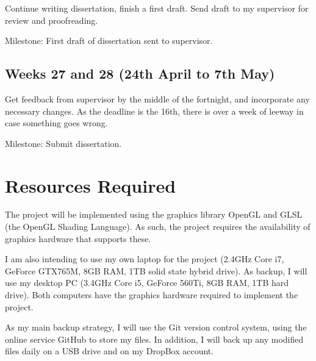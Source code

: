 \documentclass[12pt,twoside,notitlepage]{report}
\begin{document}
Continue writing dissertation, finish a first draft. Send draft to my supervisor for review and proofreading.

Milestone: First draft of dissertation sent to supervisor.

\subsection*{Weeks 27 and 28 (24th April to 7th May)}

Get feedback from supervisor by the middle of the fortnight, and incorporate any necessary changes. As the deadline is the 16th, there is over a week of leeway in case something goes wrong.

Milestone: Submit dissertation.

\section*{Resources Required}

The project will be implemented using the graphics library OpenGL and GLSL (the OpenGL Shading Language). As such, the project requires the availability of graphics hardware that supports these.

I am also intending to use my own laptop for the project (2.4GHz Core i7, GeForce GTX765M, 8GB RAM, 1TB solid state hybrid drive). As backup, I will use my desktop PC (3.4GHz Core i5, GeForce 560Ti, 8GB RAM, 1TB hard drive). Both computers have the graphics hardware required to implement the project.

As my main backup strategy, I will use the Git version control system, using the online service GitHub to store my files. In addition, I will back up any modified files daily on a USB drive and on my DropBox account.
\end{document}
